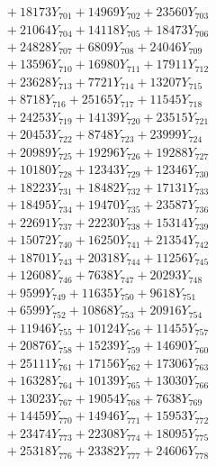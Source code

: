 \documentclass[a4paper,10pt]{article}
\begin{document}
{\begin{align}
&\;  + 18173 Y_{701} + 14969 Y_{702} + 23560 Y_{703} \\[0.3ex]
&\;  + 21064 Y_{704} + 14118 Y_{705} + 18473 Y_{706} \\[0.3ex]
&\;  + 24828 Y_{707} + 6809 Y_{708} + 24046 Y_{709} \\[0.3ex]
&\;  + 13596 Y_{710} + 16980 Y_{711} + 17911 Y_{712} \\[0.3ex]
&\;  + 23628 Y_{713} + 7721 Y_{714} + 13207 Y_{715} \\[0.3ex]
&\;  + 8718 Y_{716} + 25165 Y_{717} + 11545 Y_{718} \\[0.5ex]\allowbreak
&\;  + 24253 Y_{719} + 14139 Y_{720} + 23515 Y_{721} \\[0.3ex]
&\;  + 20453 Y_{722} + 8748 Y_{723} + 23999 Y_{724} \\[0.3ex]
&\;  + 20989 Y_{725} + 19296 Y_{726} + 19288 Y_{727} \\[0.3ex]
&\;  + 10180 Y_{728} + 12343 Y_{729} + 12346 Y_{730} \\[0.3ex]
&\;  + 18223 Y_{731} + 18482 Y_{732} + 17131 Y_{733} \\[0.3ex]
&\;  + 18495 Y_{734} + 19470 Y_{735} + 23587 Y_{736} \\[0.3ex]
&\;  + 22691 Y_{737} + 22230 Y_{738} + 15314 Y_{739} \\[0.3ex]
&\;  + 15072 Y_{740} + 16250 Y_{741} + 21354 Y_{742} \\[0.3ex]
&\;  + 18701 Y_{743} + 20318 Y_{744} + 11256 Y_{745} \\[0.3ex]
&\;  + 12608 Y_{746} + 7638 Y_{747} + 20293 Y_{748} \\[0.5ex]\allowbreak
&\;  + 9599 Y_{749} + 11635 Y_{750} + 9618 Y_{751} \\[0.3ex]
&\;  + 6599 Y_{752} + 10868 Y_{753} + 20916 Y_{754} \\[0.3ex]
&\;  + 11946 Y_{755} + 10124 Y_{756} + 11455 Y_{757} \\[0.3ex]
&\;  + 20876 Y_{758} + 15239 Y_{759} + 14690 Y_{760} \\[0.3ex]
&\;  + 25111 Y_{761} + 17156 Y_{762} + 17306 Y_{763} \\[0.3ex]
&\;  + 16328 Y_{764} + 10139 Y_{765} + 13030 Y_{766} \\[0.3ex]
&\;  + 13023 Y_{767} + 19054 Y_{768} + 7638 Y_{769} \\[0.3ex]
&\;  + 14459 Y_{770} + 14946 Y_{771} + 15953 Y_{772} \\[0.3ex]
&\;  + 23474 Y_{773} + 22308 Y_{774} + 18095 Y_{775} \\[0.3ex]
&\;  + 25318 Y_{776} + 23382 Y_{777} + 24606 Y_{778} \\[0.5ex]\allowbreak

\end{align}}
\end{document}
